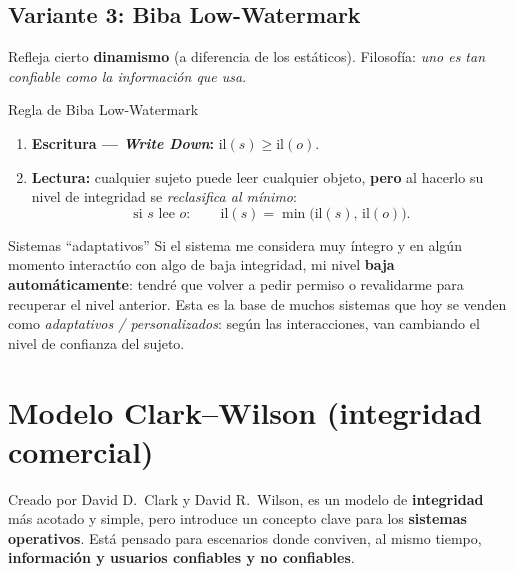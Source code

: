 \documentclass[11pt,a4paper]{article}
\newcommand{\il}{\mathrm{il}}                     %
\begin{document}
\subsection{Variante 3: Biba Low-Watermark}
Refleja cierto \textbf{dinamismo} (a diferencia de los estáticos). Filosofía: \emph{uno es
tan confiable como la información que usa}.

\begin{defbox}{Regla de Biba Low-Watermark}
\begin{enumerate}[leftmargin=1.7em,itemsep=3pt]
  \item \textbf{Escritura — \emph{Write Down}:} $\il(s)\ge\il(o)$.
  \item \textbf{Lectura:} cualquier sujeto puede leer cualquier objeto, \textbf{pero} al
        hacerlo su nivel de integridad se \emph{reclasifica al mínimo}:
        \[ \text{si } s \text{ lee } o:\qquad \il(s) = \min\bigl(\il(s),\, \il(o)\bigr). \]
\end{enumerate}
\end{defbox}

\begin{anecbox}{Sistemas ``adaptativos''}
Si el sistema me considera muy íntegro y en algún momento interactúo con algo de baja
integridad, mi nivel \textbf{baja automáticamente}: tendré que volver a pedir permiso o
revalidarme para recuperar el nivel anterior. Esta es la base de muchos sistemas que hoy se
venden como \emph{adaptativos / personalizados}: según las interacciones, van cambiando el
nivel de confianza del sujeto.
\end{anecbox}

\section{Modelo Clark--Wilson (integridad comercial)}

Creado por David D.~Clark y David R.~Wilson, es un modelo de \textbf{integridad} más acotado
y simple, pero introduce un concepto clave para los \textbf{sistemas operativos}. Está pensado
para escenarios donde conviven, al mismo tiempo, \textbf{información y usuarios confiables y no
confiables}.
\end{document}
